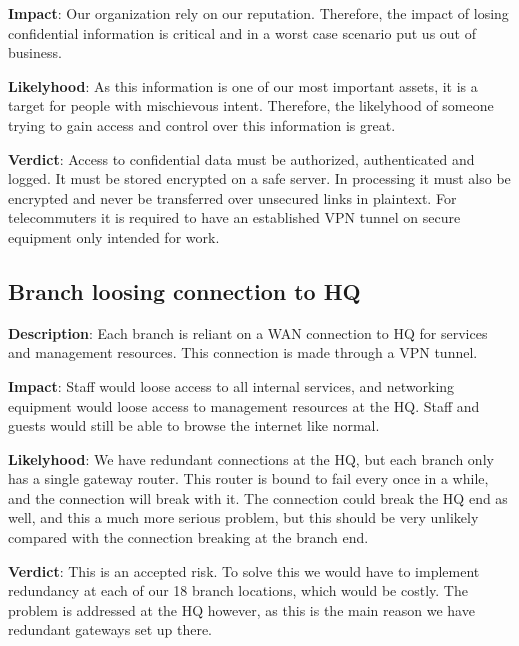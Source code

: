 \textbf{Impact}: Our organization rely on our reputation. Therefore, the impact of losing confidential information is critical and in a worst case scenario put us out of business.

\textbf{Likelyhood}: As this information is one of our most important assets, it is a target for people with mischievous intent. Therefore, the likelyhood of someone trying to gain access and control over this information is great.

\textbf{Verdict}: Access to confidential data must be authorized, authenticated and logged. It must be stored encrypted on a safe server. In processing it must also be encrypted and never be transferred over unsecured links in plaintext. For telecommuters it is required to have an established VPN tunnel on secure equipment only intended for work.

%

\subsection{Branch loosing connection to HQ}

\textbf{Description}: Each branch is reliant on a WAN connection to HQ for services and management resources. This connection is made through a VPN tunnel.

\textbf{Impact}: Staff would loose access to all internal services, and networking equipment would loose access to management resources at the HQ. Staff and guests would still be able to browse the internet like normal.

\textbf{Likelyhood}: We have redundant connections at the HQ, but each branch only has a single gateway router. This router is bound to fail every once in a while, and the connection will break with it. The connection could break the HQ end as well, and this a much more serious problem, but this should be very unlikely compared with the connection breaking at the branch end.

\textbf{Verdict}: This is an accepted risk. To solve this we would have to implement redundancy at each of our 18 branch locations, which would be costly. The problem is addressed at the HQ however, as this is the main reason we have redundant gateways set up there.


